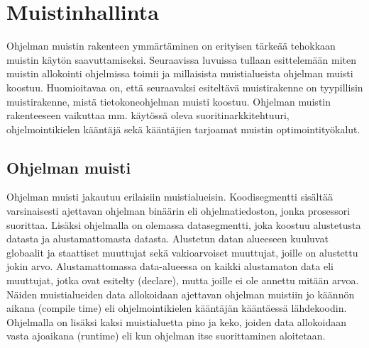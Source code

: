 \chapter{Muistinhallinta} \label{Toinen luku}

Ohjelman muistin rakenteen ymmärtäminen on erityisen tärkeää tehokkaan muistin käytön saavuttamiseksi. Seuraavissa luvuissa tullaan esittelemään miten muistin allokointi ohjelmissa toimii
ja millaisista muistialueista ohjelman muisti koostuu. Huomioitavaa on, että seuraavaksi esiteltävä muistirakenne on tyypillisin muistirakenne, mistä tietokoneohjelman muisti koostuu. Ohjelman muistin rakenteeseen vaikuttaa mm. käytössä oleva suoritinarkkitehtuuri, ohjelmointikielen kääntäjä sekä kääntäjien tarjoamat muistin optimointityökalut.

\section{Ohjelman muisti}

Ohjelman muisti jakautuu erilaisiin muistialueisin. Koodisegmentti sisältää varsinaisesti ajettavan ohjelman binäärin eli ohjelmatiedoston, jonka prosessori suorittaa. Lisäksi ohjelmalla on olemassa datasegmentti, joka koostuu alustetusta datasta ja alustamattomasta datasta. Alustetun datan alueeseen kuuluvat globaalit ja staattiset muuttujat sekä vakioarvoiset muuttujat, joille on alustettu jokin arvo. Alustamattomassa data-alueessa on kaikki alustamaton data eli muuttujat, jotka ovat esitelty (declare), mutta joille ei ole annettu mitään arvoa.\cite{mmic2010} Näiden muistialueiden data allokoidaan ajettavan ohjelman muistiin jo käännön aikana (compile time) eli ohjelmointikielen kääntäjän kääntäessä lähdekoodin. Ohjelmalla on lisäksi kaksi muistialuetta pino ja keko, joiden data allokoidaan vasta ajoaikana (runtime) eli kun ohjelman itse suorittaminen aloitetaan.

